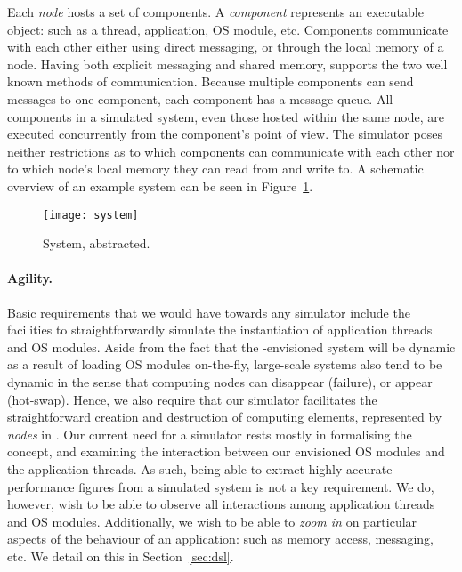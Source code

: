 Each \emph{node} hosts a set of components.
A \emph{component} represents an executable object: such as a thread, application, OS module, etc.
Components communicate with each other either using direct messaging, or through the local memory of a node.
Having both explicit messaging and shared memory, \soosim supports the two well known methods of communication.
Because multiple components can send messages to one component, each component has a message queue.
All components in a simulated system, even those hosted within the same node, are executed concurrently from the component's point of view.
The simulator poses neither restrictions as to which components can communicate with each other nor to which node's local memory they can read from and write to.
A schematic overview of an example system can be seen in Figure~\ref{fig:system}.

\begin{figure}
\centering
%
\texttt{[image: system]}
\caption{System, abstracted.}
\label{fig:system}
\end{figure}

\paragraph{Agility.}
Basic requirements that we would have towards any simulator include the facilities to straightforwardly simulate the instantiation of application threads and OS modules.
Aside from the fact that the \soos-envisioned system will be dynamic as a result of loading OS modules on-the-fly, large-scale systems also tend to be dynamic in the sense that computing nodes can disappear (failure), or
appear (hot-swap).
Hence, we also require that our simulator facilitates the straightforward creation and destruction of computing elements, represented by \emph{nodes} in \soosim.
Our current need for a simulator rests mostly in formalising the \soos concept, and examining the interaction between our envisioned OS modules and the application threads.
As such, being able to extract highly accurate performance figures from a simulated system is not a key requirement.
We do, however, wish to be able to observe all interactions among application threads and OS modules.
Additionally, we wish to be able to \emph{zoom in} on particular aspects of the behaviour of an application: such as memory access, messaging, etc.
We detail on this in Section~\ref{sec:dsl}.

